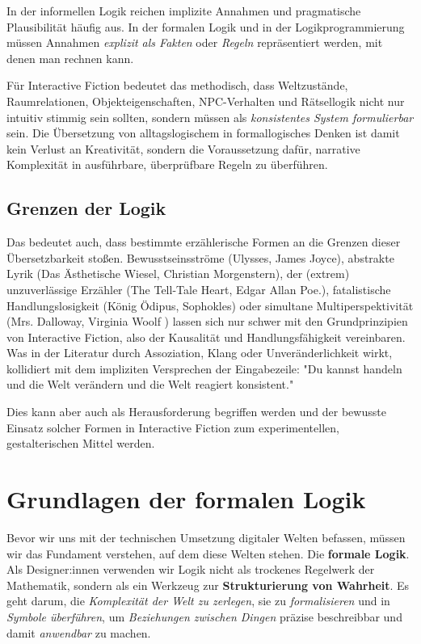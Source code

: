\documentclass[parskip=half,a4paper,11pt]{scrreprt}
\begin{document}
In der informellen Logik reichen implizite Annahmen und pragmatische Plausibilität häufig aus. In der formalen Logik und in der Logikprogrammierung müssen Annahmen \textit{explizit als Fakten} oder\textit{ Regeln} repräsentiert werden, mit denen man rechnen kann.

Für Interactive Fiction bedeutet das methodisch, dass Weltzustände, Raumrelationen, Objekteigenschaften, NPC-Verhalten und Rätsellogik nicht nur intuitiv stimmig sein sollten, sondern müssen als\textit{ konsistentes System formulierbar} sein. Die Übersetzung von alltagslogischem in formallogisches Denken ist damit kein Verlust an Kreativität, sondern die Voraussetzung dafür, narrative Komplexität in ausführbare, überprüfbare Regeln zu überführen.

\subsection{Grenzen der Logik}

Das bedeutet auch, dass bestimmte erzählerische Formen an die Grenzen dieser Übersetzbarkeit stoßen. Bewusstseinsströme (Ulysses, James Joyce), abstrakte Lyrik (Das Ästhetische Wiesel, Christian Morgenstern), der (extrem) unzuverlässige Erzähler (The Tell-Tale Heart, Edgar Allan Poe.),  fatalistische Handlungslosigkeit (König Ödipus, Sophokles) oder simultane Multiperspektivität (Mrs. Dalloway, Virginia Woolf ) lassen sich nur schwer mit den Grundprinzipien von Interactive Fiction, also der Kausalität und Handlungsfähigkeit vereinbaren. Was in der Literatur durch Assoziation, Klang oder Unveränderlichkeit wirkt, kollidiert mit dem impliziten Versprechen der Eingabezeile: "Du kannst handeln und die Welt verändern und die Welt reagiert konsistent." 

Dies kann aber auch als Herausforderung begriffen werden und der bewusste Einsatz solcher Formen in Interactive Fiction zum experimentellen, gestalterischen Mittel werden.

\section{Grundlagen der formalen Logik}

Bevor wir uns mit der technischen Umsetzung digitaler Welten befassen, müssen wir das Fundament verstehen, auf dem diese Welten stehen. Die \textbf{formale Logik}. Als Designer:innen verwenden wir Logik nicht als trockenes Regelwerk der Mathematik, sondern als ein Werkzeug zur \textbf{Strukturierung von Wahrheit}. Es geht darum, die \textit{Komplexität der Welt zu zerlegen}, sie zu \textit{formalisieren} und in \textit{Symbole überführen}, um\textit{ Beziehungen zwischen Dingen} präzise beschreibbar und damit\textit{ anwendbar }zu machen.
\end{document}
